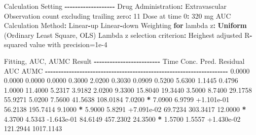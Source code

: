 \documentclass[
  10pt,
]{krantz}
\makeatletter
\newenvironment{Shaded}{\begin{snugshade}}{\end{snugshade}}
\newcommand{\ControlFlowTok}[1]{\textcolor[rgb]{0.13,0.29,0.53}{\textbf{#1}}}
\newcommand{\DecValTok}[1]{\textcolor[rgb]{0.00,0.00,0.81}{#1}}
\newcommand{\FloatTok}[1]{\textcolor[rgb]{0.00,0.00,0.81}{#1}}
\newcommand{\KeywordTok}[1]{\textcolor[rgb]{0.13,0.29,0.53}{\textbf{#1}}}
\newcommand{\NormalTok}[1]{#1}
\newcommand{\OperatorTok}[1]{\textcolor[rgb]{0.81,0.36,0.00}{\textbf{#1}}}
\newcommand{\StringTok}[1]{\textcolor[rgb]{0.31,0.60,0.02}{#1}}
\newenvironment{kframe}{%
\medskip{}
\setlength{\fboxsep}{.8em}
 \def\at@end@of@kframe{}%
 \ifinner\ifhmode%
  \def\at@end@of@kframe{\end{minipage}}%
  \begin{minipage}{\columnwidth}%
 \fi\fi%
 \def\FrameCommand##1{\hskip\@totalleftmargin \hskip-\fboxsep
 \colorbox{shadecolor}{##1}\hskip-\fboxsep
     \hskip-\linewidth \hskip-\@totalleftmargin \hskip\columnwidth}%
 \MakeFramed {\advance\hsize-\width
   \@totalleftmargin\z@ \linewidth\hsize
   \@setminipage}}%
 {\par\unskip\endMakeFramed%
 \at@end@of@kframe}
\renewenvironment{Shaded}{\begin{kframe}}{\end{kframe}}
\makeatother
\begin{document}
\begin{Shaded}
\begin{Highlighting}[]
\NormalTok{Calculation Setting}
\OperatorTok{{-}{-}{-}{-}{-}{-}{-}{-}{-}{-}{-}{-}{-}{-}{-}{-}{-}{-}{-}}
\NormalTok{Drug Administration}\OperatorTok{:}\StringTok{ }\NormalTok{Extravascular}
\NormalTok{Observation count excluding trailing zero}\OperatorTok{:}\StringTok{ }\DecValTok{11}
\NormalTok{Dose at time }\DecValTok{0}\OperatorTok{:}\StringTok{ }\DecValTok{320}\NormalTok{ mg}
\NormalTok{AUC Calculation Method}\OperatorTok{:}\StringTok{ }\NormalTok{Linear}\OperatorTok{{-}}\NormalTok{up Linear}\OperatorTok{{-}}\NormalTok{down}
\NormalTok{Weighting }\ControlFlowTok{for}\NormalTok{ lambda z}\OperatorTok{:}\StringTok{ }\KeywordTok{Uniform}\NormalTok{ (Ordinary Least Square, OLS)}
\NormalTok{Lambda z selection criterion}\OperatorTok{:}\StringTok{ }\NormalTok{Heighest adjusted R}\OperatorTok{{-}}\NormalTok{squared value with precision=}\FloatTok{1e{-}4}


\NormalTok{Fitting, AUC, AUMC Result}
\OperatorTok{{-}{-}{-}{-}{-}{-}{-}{-}{-}{-}{-}{-}{-}{-}{-}{-}{-}{-}{-}{-}{-}{-}{-}{-}{-}}
\StringTok{      }\NormalTok{Time         Conc.      Pred.   Residual       AUC       AUMC}
\OperatorTok{{-}{-}{-}{-}{-}{-}{-}{-}{-}{-}{-}{-}{-}{-}{-}{-}{-}{-}{-}{-}{-}{-}{-}{-}{-}{-}{-}{-}{-}{-}{-}{-}{-}{-}{-}{-}{-}{-}{-}{-}{-}{-}{-}{-}{-}{-}{-}{-}{-}{-}{-}{-}{-}{-}{-}{-}{-}{-}{-}{-}{-}{-}{-}{-}{-}{-}{-}{-}{-}}
\StringTok{     }\FloatTok{0.0000}       \FloatTok{0.0000}                           \FloatTok{0.0000}     \FloatTok{0.0000}
     \FloatTok{0.3000}       \FloatTok{2.0200}                           \FloatTok{0.3030}     \FloatTok{0.0909}
     \FloatTok{0.5200}       \FloatTok{5.6300}                           \FloatTok{1.1445}     \FloatTok{0.4796}
     \FloatTok{1.0000}      \FloatTok{11.4000}                           \FloatTok{5.2317}     \FloatTok{3.9182}
     \FloatTok{2.0200}       \FloatTok{9.3300}                          \FloatTok{15.8040}    \FloatTok{19.3440}
     \FloatTok{3.5000}       \FloatTok{8.7400}                          \FloatTok{29.1758}    \FloatTok{55.9271}
     \FloatTok{5.0200}       \FloatTok{7.5600}                          \FloatTok{41.5638}   \FloatTok{108.0184}
     \FloatTok{7.0200} \OperatorTok{*}\StringTok{     }\FloatTok{7.0900}     \FloatTok{6.9799} \FloatTok{+1.101e{-}01}    \FloatTok{56.2138}   \FloatTok{195.7414}
     \FloatTok{9.1000} \OperatorTok{*}\StringTok{     }\FloatTok{5.9000}     \FloatTok{5.8291} \FloatTok{+7.091e{-}02}    \FloatTok{69.7234}   \FloatTok{303.3417}
    \FloatTok{12.0000} \OperatorTok{*}\StringTok{     }\FloatTok{4.3700}     \FloatTok{4.5343} \FloatTok{{-}1.643e{-}01}    \FloatTok{84.6149}   \FloatTok{457.2302}
    \FloatTok{24.3500} \OperatorTok{*}\StringTok{     }\FloatTok{1.5700}     \FloatTok{1.5557} \FloatTok{+1.430e{-}02}   \FloatTok{121.2944}  \FloatTok{1017.1143}


\end{Highlighting}
\end{Shaded}
\end{document}
